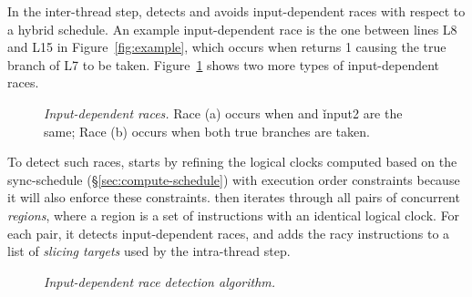 In the inter-thread step, \peregrine detects and avoids input-dependent races
with respect to a hybrid schedule.  An example input-dependent race is the
one between lines L8 and L15 in Figure~\ref{fig:example}, which occurs when
 returns 1 causing the true branch of L7 to be taken.
Figure~\ref{fig:input-race-examples} shows two more types of input-dependent races.

\begin{figure}[b]
\vspace{-.1in}
\centering
{}
\begin{minipage}[b]{.225\textwidth}
\end{minipage}
\begin{minipage}[b]{.225\textwidth}
\end{minipage}
\vspace{-.1in}
\caption{{\em Input-dependent races.} Race (a) occurs when
   and \v{input2} are the same; Race (b) occurs when
  both true branches are taken.} \label{fig:input-race-examples}
\end{figure}

To detect such races, \peregrine starts by refining the logical clocks computed
based on the sync-schedule (\S\ref{sec:compute-schedule}) with
execution order constraints because it will also enforce these
constraints.  \peregrine then iterates through all pairs
of concurrent \emph{regions}, where a region is a set of instructions with an identical
logical clock.  For each pair, it detects input-dependent races, and adds
the racy instructions to a list of \emph{slicing targets} used by the
intra-thread step.

\begin{figure}[t]
\centering
\begin{minipage}[t]{.5\textwidth}
\end{minipage}
\vspace{-.2in}
\caption{{\em Input-dependent race detection
    algorithm.}} \label{fig:detect-input-race}
\vspace{-.1in}
\end{figure}

